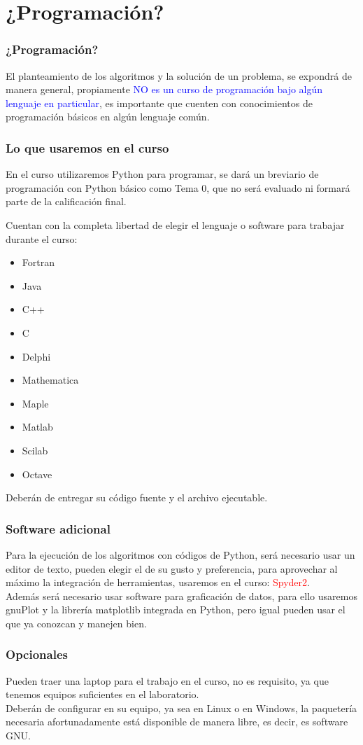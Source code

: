 \documentclass[12pt]{beamer}
\begin{document}
\section{¿Programaci\'{o}n?}
\begin{frame}
\frametitle{¿Programaci\'{o}n?}
El planteamiento de los algoritmos y la soluci\'{o}n de un problema, se expondr\'{a} de manera general, propiamente \textcolor{blue}{NO es un curso de programación bajo alg\'{u}n lenguaje en particular}, es importante que cuenten con conocimientos de programaci\'{o}n b\'{a}sicos en alg\'{u}n lenguaje com\'{u}n.
\end{frame}
\begin{frame}
\frametitle{Lo que usaremos en el curso}
En el curso utilizaremos Python para programar, se dar\'{a} un breviario de programaci\'{o}n con Python b\'{a}sico como Tema 0, que no ser\'{a} evaluado ni formar\'{a} parte de la calificaci\'{o}n final.
\end{frame}
\begin{frame}
Cuentan con la completa libertad de elegir el lenguaje o software para trabajar durante el curso:
\begin{multicols}{2}
\begin{itemize}
\item Fortran
\item Java
\item C++
\item C
\item Delphi
\item Mathematica
\item Maple
\item Matlab
\item Scilab
\item Octave
\end{itemize}
\end{multicols}
Deber\'{a}n de entregar su c\'{o}digo fuente y el archivo ejecutable.
\end{frame}
\begin{frame}
\frametitle{Software adicional}
Para la ejecuci\'{o}n de los algoritmos con c\'{o}digos de Python, ser\'{a} necesario usar un editor de texto, pueden elegir el de su gusto y preferencia, para aprovechar al m\'{a}ximo la integraci\'{o}n de herramientas, usaremos en el curso: \textcolor{red}{Spyder2}.
\\
\bigskip
Adem\'{a}s ser\'{a} necesario usar software para graficaci\'{o}n de datos, para ello usaremos gnuPlot y la librer\'{i}a matplotlib integrada en Python, pero igual pueden usar el que ya conozcan y manejen bien.
\end{frame}
\begin{frame}
\frametitle{Opcionales}
Pueden traer una laptop para el trabajo en el curso, no es requisito, ya que tenemos equipos suficientes en el laboratorio.
\\
\medskip
Deber\'{a}n de configurar en su equipo, ya sea en Linux o en Windows, la paqueter\'{i}a necesaria afortunadamente est\'{a} disponible de manera libre, es decir, es software GNU.
\end{frame}
\end{document}
